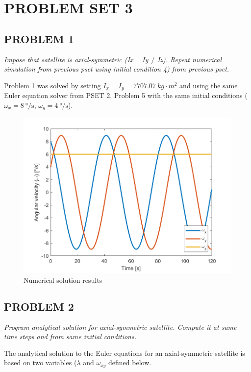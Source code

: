 \section{\Large PROBLEM SET 3}
\subsection{PROBLEM 1}
\textit{Impose that satellite is axial-symmetric (Ix$=$Iy$\neq$Iz). Repeat numerical simulation from previous pset using initial condition 4) from previous pset.}

Problem 1 was solved by setting $I_x = I_y = \qty{7707.07}{kg \cdot m^2}$ and using the same Euler equation solver from PSET 2, Problem 5 with the same initial conditions ($\omega_{x} = \qty{8}{\degree\per\second}$, $\omega_{y} = \qty{4}{\degree\per\second}$).

\begin{figure}[H]
\centering
\includegraphics[scale=0.6]{Images/ps3_problem1.png}
\caption{Numerical solution results}
\label{fig:ps3_problem1}
\end{figure}


\subsection{PROBLEM 2}
\textit{Program analytical solution for axial-symmetric satellite. Compute it at same time steps and from same initial conditions.}

The analytical solution to the Euler equations for an axial-symmetric satellite is based on two variables ($\lambda$ and $\omega_{xy}$ defined below.

